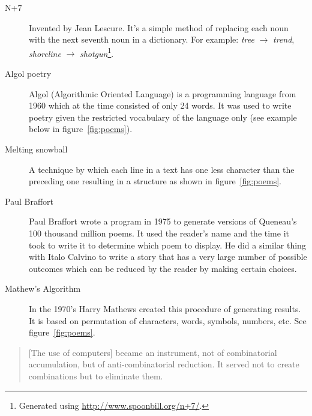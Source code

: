 \begin{description}
  \item[N+7] Invented by Jean Lescure. It's a simple method of replacing each noun with the next seventh noun in a dictionary. For example: \textit{tree} $\rightarrow$ \textit{trend}, \textit{shoreline} $\rightarrow$ \textit{shotgun}\footnote{Generated using \url{http://www.spoonbill.org/n+7/}.}.
  \item[Algol poetry] Algol (Algorithmic Oriented Language) is a programming language from 1960 which at the time consisted of only \num{24} words. It was used to write poetry given the restricted vocabulary of the language only (see example below in figure~\ref{fig:poems}).
  \item[Melting snowball] A technique by which each line in a text has one less character than the preceding one resulting in a structure as shown in figure~\ref{fig:poems}.
  \item[Paul Braffort] Paul Braffort wrote a program in 1975 to generate versions of Queneau's \num{100} thousand million poems. It used the reader's name and the time it took to write it to determine which poem to display. He did a similar thing with Italo Calvino to write a story that has a very large number of possible outcomes which can be reduced by the reader by making certain choices.
  \item[Mathew's Algorithm] In the 1970's Harry Mathews created this procedure of generating results. It is based on permutation of characters, words, symbols, numbers, etc. See figure~\ref{fig:poems}.
\end{description}

\begin{quotation}
  [The use of computers] became an instrument, not of combinatorial accumulation, but of anti-combinatorial reduction. It served not to create combinations but to eliminate them.
\end{quotation}

